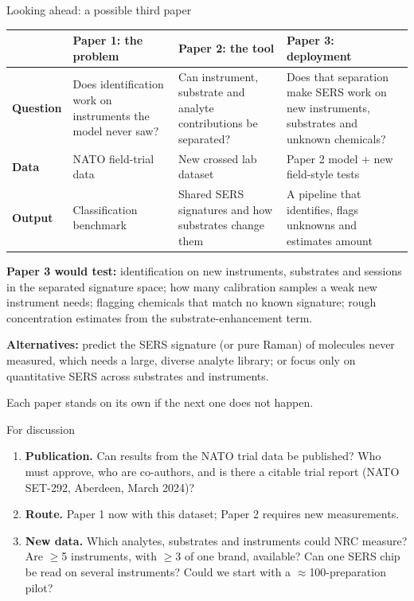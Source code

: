 \documentclass[aspectratio=169,10pt]{beamer}
\newcommand{\takeaway}[1]{%
  \par\vspace{2pt}\noindent\colorbox{cTake}{\parbox{\dimexpr\textwidth-2\fboxsep\relax}{\small #1}}}
\begin{document}
\begin{frame}{Looking ahead: a possible third paper}
\footnotesize
\renewcommand{\arraystretch}{1.25}
\begin{tabular}{@{}>{\bfseries}p{}>{\raggedright\arraybackslash}p{}>{\raggedright\arraybackslash}p{}>{\raggedright\arraybackslash}p{}@{}}
\toprule
& Paper 1: the problem & Paper 2: the tool & Paper 3: deployment\\
\midrule
Question & Does identification work on instruments the model never saw? & Can instrument, substrate and analyte contributions be separated? & Does that separation make SERS work on new instruments, substrates and unknown chemicals?\\
Data & NATO field-trial data & New crossed lab dataset & Paper 2 model + new field-style tests\\
Output & Classification benchmark & Shared SERS signatures and how substrates change them & A pipeline that identifies, flags unknowns and estimates amount\\
\bottomrule
\end{tabular}

\medskip
\small
\textbf{Paper 3 would test:} identification on new instruments, substrates and sessions in the separated signature space; how many calibration samples a weak new instrument needs; flagging chemicals that match no known signature; rough concentration estimates from the substrate-enhancement term.

\smallskip
\textbf{Alternatives:} predict the SERS signature (or pure Raman) of molecules never measured, which needs a large, diverse analyte library; or focus only on quantitative SERS across substrates and instruments.
\takeaway{Each paper stands on its own if the next one does not happen.}
\end{frame}

\begin{frame}[t]{For discussion}\vspace{0.6em}
\begin{enumerate}
  \item \textbf{Publication.} Can results from the NATO trial data be published? Who must approve, who are co-authors, and is there a citable trial report (NATO SET-292, Aberdeen, March 2024)?
  \item \textbf{Route.} Paper 1 now with this dataset; Paper 2 requires new measurements.
  \item \textbf{New data.} Which analytes, substrates and instruments could NRC measure? Are $\geq$5 instruments, with $\geq$3 of one brand, available? Can one SERS chip be read on several instruments? Could we start with a $\approx$100-preparation pilot?
\end{enumerate}
\end{frame}
\end{document}

